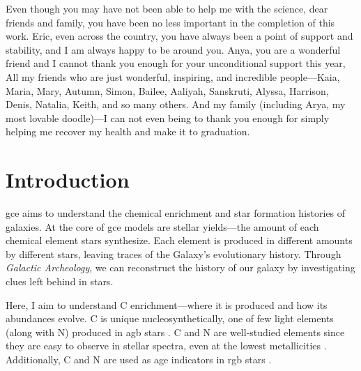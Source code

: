 \documentclass[12pt,oneside,letterpaper]{report}
\newcommand{\agb}{\gls{agb}}
\newcommand{\gce}{\gls{gce}}
\newcommand{\Gce}{\Gls{gce}}
\begin{document}
Even though you may have not been able to help me with the science, dear friends and family, you have been no less important in the completion of this work. 
Eric, even across the country, you have always been a point of support and stability, and I am always happy to be around you. Anya, you are a wonderful friend and I cannot thank you enough for your unconditional support this year, 
All my friends who are just wonderful, inspiring, and incredible people---Kaia, Maria, Mary, Autumn, Simon, Bailee, Aaliyah, Sanskruti, Alyssa, Harrison, Denis, Natalia, Keith, and so many others. 
And my family (including Arya, my most lovable doodle)---I can not even being to thank you enough for simply helping me recover my health and make it to graduation. 









\tableofcontents
\listoffigures
\listoftables
\newpage
{}









\chapter{Introduction}

\Gce{} aims to understand the chemical enrichment and star formation histories of galaxies. At the core of \gce{} models are stellar \glspl{yield}---the amount of each chemical element stars synthesize. Each element is produced in different amounts by different stars, leaving traces of the Galaxy's evolutionary history. Through \textit{Galactic Archeology}, we can reconstruct the history of our galaxy by investigating clues left behind in stars.

Here, I aim to understand C enrichment---where it is produced and how its abundances evolve. C is unique nucleosynthetically, one of few light elements (along with N) produced in \agb{} stars \citep[e.g.][]{jennifer19, KL14}. C and N are well-studied elements since they are easy to observe in stellar spectra, even at the lowest metallicities \cite[e.g.][]{fabbian+09, nissen+14, lambert81, laird85, lambert86}. Additionally, C and N are used as age indicators in \gls{rgb} stars \citep{martig16, MG15, hasselquist19, vincenzo+21}.
\end{document}
